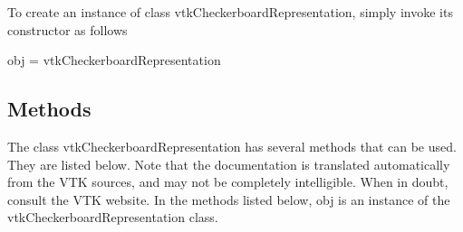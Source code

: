 To create an instance of class vtk\-Checkerboard\-Representation, simply invoke its constructor as follows \begin{DoxyVerb}  obj = vtkCheckerboardRepresentation
\end{DoxyVerb}
 \hypertarget{vtkwidgets_vtkxyplotwidget_Methods}{}\subsection{Methods}\label{vtkwidgets_vtkxyplotwidget_Methods}
The class vtk\-Checkerboard\-Representation has several methods that can be used. They are listed below. Note that the documentation is translated automatically from the V\-T\-K sources, and may not be completely intelligible. When in doubt, consult the V\-T\-K website. In the methods listed below, {\ttfamily obj} is an instance of the vtk\-Checkerboard\-Representation class. 
